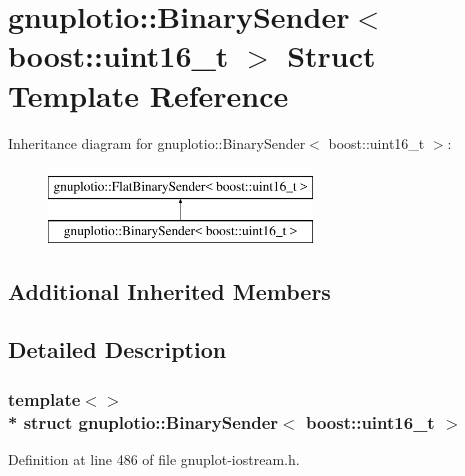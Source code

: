 \hypertarget{structgnuplotio_1_1_binary_sender_3_01boost_1_1uint16__t_01_4}{}\section{gnuplotio\+:\+:Binary\+Sender$<$ boost\+:\+:uint16\+\_\+t $>$ Struct Template Reference}
\label{structgnuplotio_1_1_binary_sender_3_01boost_1_1uint16__t_01_4}
Inheritance diagram for gnuplotio\+:\+:Binary\+Sender$<$ boost\+:\+:uint16\+\_\+t $>$\+:\begin{figure}[H]
\begin{center}
\leavevmode
\includegraphics[height=2.000000cm]{structgnuplotio_1_1_binary_sender_3_01boost_1_1uint16__t_01_4}
\end{center}
\end{figure}
\subsection*{Additional Inherited Members}


\subsection{Detailed Description}
\subsubsection*{template$<$$>$\\*
struct gnuplotio\+::\+Binary\+Sender$<$ boost\+::uint16\+\_\+t $>$}



Definition at line 486 of file gnuplot-\/iostream.\+h.

